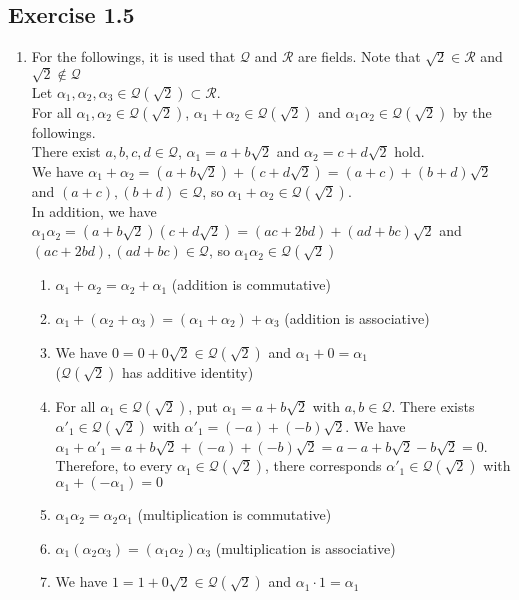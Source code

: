 \documentclass{article}
\theoremstyle{thmstyleone}
\theoremstyle{thmstyletwo}
\theoremstyle{thmstylethree}
\newcommand\Q{\mathcal Q}
\newcommand\R{\mathcal R}
\begin{document}
\subsection{Exercise 1.5} 
\begin{enumerate}[label = (\alph*)]
\item
For the followings, it is used that $\Q$ and $\R$ are fields. Note that $\sqrt2 \in \R$ and $\sqrt2 \not\in \Q$\\
Let $\alpha_1, \alpha_2, \alpha_3 \in \Q(\sqrt2) \subset \R$.\\
For all $\alpha_1, \alpha_2 \in \Q(\sqrt2)$, $\alpha_1 + \alpha_2 \in \Q(\sqrt2)$ and $\alpha_1\alpha_2 \in \Q(\sqrt2)$ by the followings.\\
There exist $a,b,c,d \in \Q$, $\alpha_1 = a + b\sqrt2$ and $\alpha_2 = c + d\sqrt2$ hold.\\
We have $\alpha_1 + \alpha_2 = (a + b\sqrt2) + (c + d\sqrt2) = (a + c) + (b + d)\sqrt2$ and $(a + c),(b + d) \in \Q$, so $\alpha_1 + \alpha_2 \in \Q(\sqrt2)$.\\
In addition, we have $\alpha_1\alpha_2 = (a + b\sqrt2)(c + d\sqrt2) = (ac + 2bd) + (ad + bc)\sqrt2$ and $(ac + 2bd),(ad +bc) \in \Q$, so $\alpha_1\alpha_2 \in \Q(\sqrt2)$
\begin{enumerate}[label=\arabic*)]
\item $\alpha_1 + \alpha_2 = \alpha_2 + \alpha_1$ (addition is commutative)
\item $\alpha_1 + (\alpha_2 + \alpha_3) = (\alpha_1 + \alpha_2) + \alpha_3$ (addition is associative)
\item We have $0 = 0 + 0\sqrt2 \in \Q(\sqrt2)$ and $\alpha_1 + 0 = \alpha_1$\\($\Q(\sqrt2)$ has additive identity)
\item For all $\alpha_1 \in \Q(\sqrt2)$, put $\alpha_1 = a + b\sqrt2$ with $a,b \in \Q$.
There exists $\alpha'_1 \in \Q(\sqrt2)$ with $\alpha'_1 = (-a) + (-b)\sqrt2$. 
We have $\alpha_1 + \alpha'_1 = a + b\sqrt2 + (-a) + (- b)\sqrt2 = a - a + b\sqrt2 - b\sqrt2 = 0$. 
Therefore, to every $\alpha_1 \in \Q(\sqrt2)$, there corresponds $\alpha'_1 \in \Q(\sqrt2)$ with $\alpha_1 + (-\alpha_1) = 0$
\item $\alpha_1\alpha_2 = \alpha_2\alpha_1$ (multiplication is commutative)
\item $\alpha_1(\alpha_2\alpha_3) = (\alpha_1\alpha_2)\alpha_3$ (multiplication is associative)
\item We have $1 = 1 + 0 \sqrt2 \in \Q(\sqrt2)$ and $\alpha_1 \cdot 1 = \alpha_1$\\

\end{enumerate}
\end{enumerate}
\end{document}
